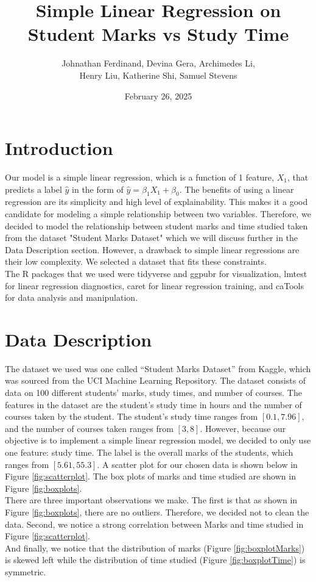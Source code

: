 \documentclass{article}
\title{Simple Linear Regression on Student Marks vs Study Time}
\author{Johnathan Ferdinand, Devina Gera, Archimedes Li, \\ Henry Liu, Katherine Shi, Samuel Stevens}
\date{February 26, 2025}
\begin{document}
\maketitle

\section{Introduction}
Our model is a simple linear regression, which is a function of 1 feature, $X_1$, that predicts a label $\hat{y}$ in the form of $\hat{y} = \beta_1X_1 + \beta_0$.  
The benefits of using a linear regression are its simplicity and high level of explainability.  
This makes it a good candidate for modeling a simple relationship between two variables.  
Therefore, we decided to model the relationship between student marks and time studied taken from the dataset "Student Marks Dataset" which we will discuss further in the Data Description section.
However, a drawback to simple linear regressions are their low complexity.  We selected a dataset that fits these constraints. \\

\noindent The R packages that we used were tidyverse and ggpubr for visualization, lmtest for linear regression diagnostics, caret for linear regression training, and caTools for data analysis and manipulation.

\section{Data Description}
The dataset we used was one called “Student Marks Dataset” from Kaggle, which was sourced from the UCI Machine Learning Repository. The dataset consists of data on 100 different students' marks, study times, and number of courses.  
The features in the dataset are the student’s study time in hours and the number of courses taken by the student.  
The student’s study time ranges from $[0.1, 7.96]$, and the number of courses taken ranges from $[3, 8]$. 
However, because our objective is to implement a simple linear regression model, we decided to only use one feature: study time.
The label is the overall marks of the students, which ranges from $[5.61, 55.3]$.  
A scatter plot for our chosen data is shown below in Figure \ref{fig:scatterplot}. 
The box plots of marks and time studied are shown in Figure \ref{fig:boxplots}. \\

\noindent There are three important observations we make. The first is that as shown in Figure \ref{fig:boxplots}, there are no outliers. Therefore, we decided not to clean the data.
Second, we notice a strong correlation between Marks and time studied in Figure \ref{fig:scatterplot}. \\
And finally, we notice that the distribution of marks (Figure \ref{fig:boxplotMarks}) is skewed left while the distribution of time studied (Figure \ref{fig:boxplotTime}) is symmetric.
\end{document}
